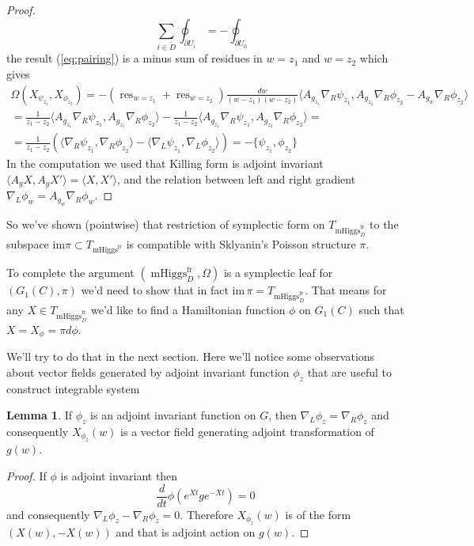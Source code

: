 \documentclass[11pt, oneside, reqno]{amsart}
\theoremstyle{definition} \newtheorem{definition}{Definition}[section]
\newtheorem{lemma}[definition]{Lemma}
\theoremstyle{definition} \newtheorem{remark}[definition]{Remark}
\theoremstyle{definition} \newtheorem{remarks}[definition]{Remarks}
\theoremstyle{definition} \newtheorem{question}[definition]{Question}
\theoremstyle{definition} \newtheorem*{note}{Note}
\theoremstyle{definition} \newtheorem{example}[definition]{Example}
\theoremstyle{definition} \newtheorem{examples}[definition]{Examples}
\DeclareMathOperator{\res}{res}
\DeclareMathOperator{\mhiggs}{mHiggs}
\newcommand{\fr}{\mathrm{fr}}
\begin{document}
\begin{proof}
\begin{equation}
  \sum_{i \in \tilde D} \oint_{\partial U_i }  = - \oint_{\partial U_0} 
\end{equation}
the result (\ref{eq:pairing}) is a minus sum of residues in $w = z_1$ and $w = z_2$
which gives
  \begin{multline}
   \Omega(X_{\psi_{z_1}}, X_{\phi_{z_2}}) = - (\res_{w = z_1}  + \res_{w = z_2}) \frac{dw }{(w - z_1)(w - z_2)} \langle A_{g_{z_1}} \nabla_{R} \psi_{z_1},
   A_{g_{z_2}} \nabla_{R} \phi_{z_2}  - A_{g_w} \nabla_{R} \phi_{z_2} \rangle \\
   =   \frac{1}{z_1 - z_2}  \langle A_{g_{z_1}} \nabla_{R} \psi_{z_1} , A_{g_{z_1}} \nabla_{R} \phi_{z_2}\rangle   - \frac{1}{z_1 - z_2}  \langle A_{g_{z_1}} \nabla_{R} \psi_{z_1} , A_{g_{z_2}} \nabla_{R} \phi_{z_2} \rangle =\\
   = \frac{1}{z_1 - z_2} (\langle \nabla_{R} \psi_{z_1} , \nabla_{R} \phi_{z_2}\rangle - 
   \langle  \nabla_{L} \psi_{z_1} , \nabla_{L} \phi_{z_2} \rangle ) =
   - \{\psi_{z_1}, \phi_{z_2} \} 
  \end{multline}
In the computation we used that Killing form is adjoint invariant
$\langle A_{g} X, A_{g} X' \rangle = \langle X, X' \rangle $,
and the relation between left and right gradient $\nabla_{L} \phi_{w} = A_{g_w} \nabla_{R} \phi_w$.
\end{proof}

So we've shown (pointwise) that restriction of symplectic form on $T_{\mhiggs^{\fr}_{D}}$
  to the subspace $\mathrm{im} \pi \subset T_{\mhiggs^{\fr}}$ is compatible with
Sklyanin's Poisson structure $\pi$.

To complete the argument  $(\mhiggs^{\fr}_{D}, \Omega)$ is
a symplectic leaf for $(G_1(C), \pi)$ we'd need to show that in fact
$\mathrm{im} \, \pi = T_{\mhiggs^{\fr}_{D}}$.
That means for any $X \in T_{\mhiggs^{\fr}_{D}} $ we'd like to find a Hamiltonian
function $\phi$ on $G_1(C)$ such that $X = X_{\phi} = \pi d \phi$.

We'll try to do that in the next section. Here we'll notice some observations
about vector fields generated by adjoint invariant function $\phi_z$ that are useful
to construct integrable system 
\begin{lemma}
 If $\phi_z$ is an adjoint invariant function on $G$, then
$\nabla_{L} \phi_z  = \nabla_{R} \phi_z$ and consequently $X_{\phi_z}(w)$ is
a vector field generating adjoint transformation of $g(w)$. 
\end{lemma}
\begin{proof}
  If $\phi$ is adjoint invariant then
  \begin{equation}
    \frac{d}{dt} \phi(e^{Xt} g e^{-Xt}) = 0
  \end{equation}
  and consequently $\nabla_{L} \phi_z - \nabla_{R} \phi_z  = 0$. Therefore $X_{\phi_z}(w)$ is
  of the form $(X(w), -X(w))$ and that is adjoint action on $g(w)$. 
\end{proof}
\end{document}
